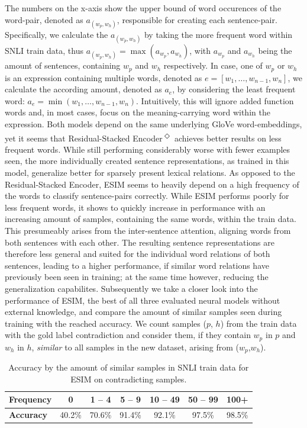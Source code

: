 The numbers on the x-axis show the upper bound of word occurences of the word-pair, denoted as $a_{(w_p,w_h)}$, responsible for creating each sentence-pair. Specifically, we calculate the $a_{(w_p,w_h)}$ by taking the more frequent word within \ac{SNLI} train data, thus $a_{(w_p,w_h)} = \max(a_{w_p},a_{w_h})$, with $a_{w_p}$ and $a_{w_h}$ being the amount of sentences, containing $w_p$ and $w_h$ respectively. In case, one of $w_p$ or $w_h$ is an expression containing multiple words, denoted as $e = [w_1, \ldots , w_{n-1}, w_{n}]$, we calculate the according amount, denoted as $a_e$, by considering the least frequent word: $a_e = \min(w_1, \ldots , w_{n-1}, w_n)$. Intuitively, this will ignore added function words and, in most cases, focus on the meaning-carrying word within the expression. Both models depend on the same underlying GloVe word-embeddings, yet it seems that Residual-Stacked Encoder\textsuperscript{$\Diamond$} achieves better results on less frequent words.  While still performing considerably worse with fewer examples seen, the more individually created sentence representations, as trained in this model, generalize better for sparsely present lexical relations. As opposed to the Residual-Stacked Encoder, ESIM seems to heavily depend on a high frequency of the words to classify sentence-pairs correctly.  While ESIM performs poorly for less frequent words, it shows to quickly increase in performance with an increasing amount of samples, containing the same words, within the train data. This presumeably arises from the inter-sentence attention, aligning words from both sentences with each other. The resulting sentence representations are therefore less general and suited for the individual word relations of both sentences, leading to a higher performance, if similar word relations have previously been seen in training; at the same time however, reducing the generalization capabilites. Subsequently we take a closer look into the performance of ESIM, the best of all three evaluated neural models without external knowledge, and compare the amount of similar samples seen during training with the reached accuracy. We count samples ($p$, $h$) from the train data with the gold label contradiction and consider them, if they contain $w_p$ in $p$ and $w_h$ in $h$, \textit{similar} to all samples in the new dataset, arising from ($w_p$,$w_h$). 
\begin{table}[tph!]
\centering
\begin{tabular}{l|c|c|c|c|c|c}
\toprule
\textbf{Frequency} & 0 & 1 -- 4 & 5 -- 9 & 10 -- 49 & 50 -- 99 & 100+ \\
\midrule
\textbf{Accuracy} & 40.2\% & 70.6\% & 91.4\% & 92.1\% & 97.5\% & 98.5\% \\
\bottomrule
\end{tabular}
\caption{Accuracy by the amount of similar samples in \ac{SNLI} train data for ESIM on contradicting samples.}
\label{tab:esim_acc_by_sim_samples}
\end{table}
